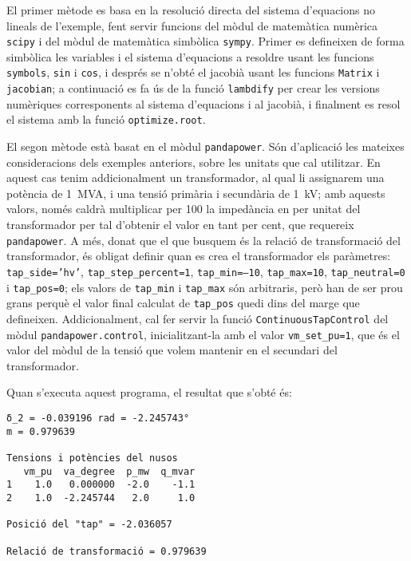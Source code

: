 El primer mètode es basa en la resolució directa del sistema d'equacions no lineals de l'exemple, fent servir funcions  del mòdul de matemàtica numèrica \texttt{scipy} i del mòdul de matemàtica simbòlica \texttt{sympy}. Primer es defineixen de forma simbòlica les variables i el sistema d'equacions a resoldre usant les funcions \texttt{symbols}, \texttt{sin} i \texttt{cos}, i després se n'obté el jacobià usant les funcions \texttt{Matrix} i \texttt{jacobian}; a continuació es fa ús de la funció  \texttt{lambdify} per crear les versions numèriques corresponents al sistema d'equacions i al jacobià, i finalment es resol el sistema amb la funció \texttt{optimize.root}.

El segon mètode està basat en el mòdul \texttt{pandapower}. Són d'aplicació les mateixes consideracions dels exemples anteriors, sobre les unitats que cal utilitzar. En aquest cas tenim addicionalment un transformador, al qual li assignarem una potència de \qty{1}{MVA}, i una tensió primària i secundària de \qty{1}{kV}; amb aquests valors, només caldrà multiplicar per 100 la impedància en per unitat  del transformador per tal d'obtenir el valor en tant per cent, que requereix \texttt{pandapower}. A més, donat que el que busquem és la relació de transformació del transformador, és obligat definir quan es crea el transformador els paràmetres: \texttt{tap\_side='hv'}, \texttt{tap\_step\_percent=1}, \texttt{tap\_min=--10}, \texttt{tap\_max=10}, \texttt{tap\_neutral=0} i  \texttt{tap\_pos=0}; els valors de \texttt{tap\_min} i \texttt{tap\_max} són arbitraris, però han de ser prou grans perquè el valor final calculat de \texttt{tap\_pos} quedi dins del marge que defineixen. Addicionalment, cal fer servir la funció \texttt{ContinuousTapControl} del mòdul \texttt{pandapower.control}, inicialitzant-la amb el valor \texttt{vm\_set\_pu=1}, que és el valor del mòdul de la tensió que volem mantenir en el secundari del transformador.


Quan s'executa aquest programa, el resultat que s'obté és:
\lstset{
	language=,
	numbers=none,
	frame=none
}
\begin{lstlisting}
δ_2 = -0.039196 rad = -2.245743°
m = 0.979639

Tensions i potències del nusos
   vm_pu  va_degree  p_mw  q_mvar
1    1.0   0.000000  -2.0    -1.1
2    1.0  -2.245744   2.0     1.0

Posició del "tap" = -2.036057

Relació de transformació = 0.979639
\end{lstlisting}

